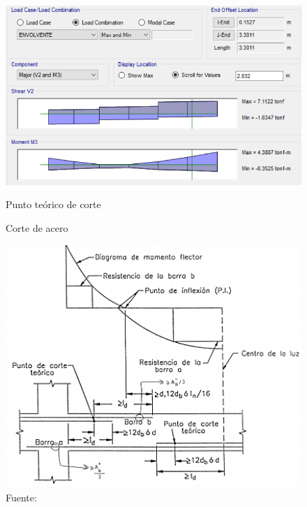 \begin{figure}[h!]
    \centering
    \caption{Punto teórico de corte}
    \includegraphics[scale=0.7]{IMAGENES/pcor.PNG}
    \label{vigcor}
\end{figure}

\begin{figure}[h!]
    \centering
    \caption{Corte de acero}
    \includegraphics[scale=0.6]{IMAGENES/corte.PNG}
    \caption*{\small Fuente: \it \cite{pasino2011}}
    \label{vigm}
\end{figure}

